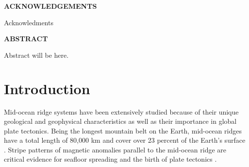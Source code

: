 \documentclass[letterpaper,12pt,notitle]{memphisthesis}                     %
\begin{document}



\doublespacing
{}

\setcounter{page}{2}

\begin{center}
	\textbf{ACKNOWLEDGEMENTS}
\end{center}
\vspace{-0.15in}

Acknowledments~~

\newpage
\begin{center}
	\textbf{ABSTRACT}
\end{center}
\vspace{-0.15in}

\thispagestyle{plain}

 Abstract will be here.

\newpage

\begin{singlespace}
	\tableofcontents
\end{singlespace}

\newpage



\begin{singlespace}
	\listoffigures
\end{singlespace}

\newpage


\chapter{Introduction}
\setcounter{section}{0}
\setcounter{subsection}{0}

Mid-ocean ridge systems have been extensively studied because of their unique geological and geophysical characteristics as well as their importance in global plate tectonics. Being the longest mountain belt on the Earth, mid-ocean ridges have a total length of 80,000 km and cover over 23 percent of the Earth’s surface \citep{Peltier1989}. Stripe patterns of magnetic anomalies parallel to the mid-ocean ridge are critical evidence for seafloor spreading and the birth of plate tectonics \citep{Hess1964}.
\end{document}
